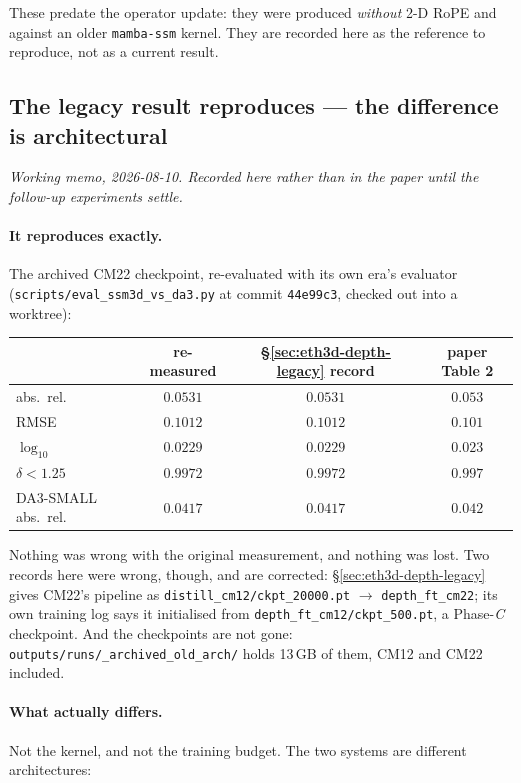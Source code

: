 \documentclass[11pt,a4paper]{article}
\begin{document}
\noindent These predate the operator update: they were produced \emph{without}
2-D RoPE and against an older \texttt{mamba-ssm} kernel. They are recorded here
as the reference to reproduce, not as a current result.

\subsection{The legacy result reproduces --- the difference is architectural}
\label{sec:eth3d-legacy-repro}

\emph{Working memo, 2026-08-10. Recorded here rather than in the paper until
the follow-up experiments settle.}

\paragraph{It reproduces exactly.} The archived CM22 checkpoint, re-evaluated
with its own era's evaluator (\texttt{scripts/eval\_ssm3d\_vs\_da3.py} at
commit \texttt{44e99c3}, checked out into a worktree):

\begin{center}\small
\begin{tabular}{lccc}
\toprule
 & re-measured & \S\ref{sec:eth3d-depth-legacy} record & paper Table 2 \\
\midrule
abs.\ rel.        & $0.0531$ & $0.0531$ & $0.053$ \\
RMSE              & $0.1012$ & $0.1012$ & $0.101$ \\
$\log_{10}$       & $0.0229$ & $0.0229$ & $0.023$ \\
$\delta{<}1.25$   & $0.9972$ & $0.9972$ & $0.997$ \\
DA3-SMALL abs.\ rel.\ & $0.0417$ & $0.0417$ & $0.042$ \\
\bottomrule
\end{tabular}
\end{center}

\noindent Nothing was wrong with the original measurement, and nothing was
lost. Two records here were wrong, though, and are corrected:
\S\ref{sec:eth3d-depth-legacy} gives CM22's pipeline as
\texttt{distill\_cm12/ckpt\_20000.pt} $\rightarrow$ \texttt{depth\_ft\_cm22};
its own training log says it initialised from
\texttt{depth\_ft\_cm12/ckpt\_500.pt}, a Phase-\emph{C} checkpoint. And the
checkpoints are not gone: \texttt{outputs/runs/\_archived\_old\_arch/} holds
13\,GB of them, CM12 and CM22 included.

\paragraph{What actually differs.} Not the kernel, and not the training
budget. The two systems are different architectures:
\end{document}
